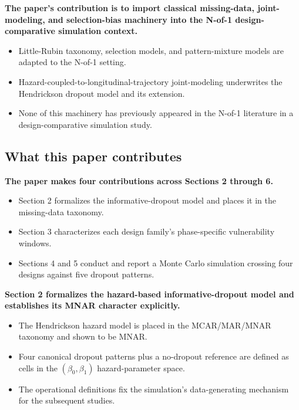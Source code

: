 \documentclass[
  11pt,
]{article}
\begin{document}
\textbf{The paper's contribution is to import classical missing-data, joint-modeling, and selection-bias machinery into the N-of-1 design-comparative simulation context.}

\begin{itemize}\setlength{\itemsep}{2pt}\setlength{\parskip}{0pt}
\item Little-Rubin taxonomy, selection models, and pattern-mixture models are adapted to the N-of-1 setting.
\item Hazard-coupled-to-longitudinal-trajectory joint-modeling underwrites the Hendrickson dropout model and its extension.
\item None of this machinery has previously appeared in the N-of-1 literature in a design-comparative simulation study.
\end{itemize}

\subsection{What this paper contributes}\label{what-this-paper-contributes}

\textbf{The paper makes four contributions across Sections 2 through 6.}

\begin{itemize}\setlength{\itemsep}{2pt}\setlength{\parskip}{0pt}
\item Section 2 formalizes the informative-dropout model and places it in the missing-data taxonomy.
\item Section 3 characterizes each design family's phase-specific vulnerability windows.
\item Sections 4 and 5 conduct and report a Monte Carlo simulation crossing four designs against five dropout patterns.
\end{itemize}

\textbf{Section 2 formalizes the hazard-based informative-dropout model and establishes its MNAR character explicitly.}

\begin{itemize}\setlength{\itemsep}{2pt}\setlength{\parskip}{0pt}
\item The Hendrickson hazard model is placed in the MCAR/MAR/MNAR taxonomy and shown to be MNAR.
\item Four canonical dropout patterns plus a no-dropout reference are defined as cells in the $(\beta_0,\beta_1)$ hazard-parameter space.
\item The operational definitions fix the simulation's data-generating mechanism for the subsequent studies.
\end{itemize}
\end{document}
